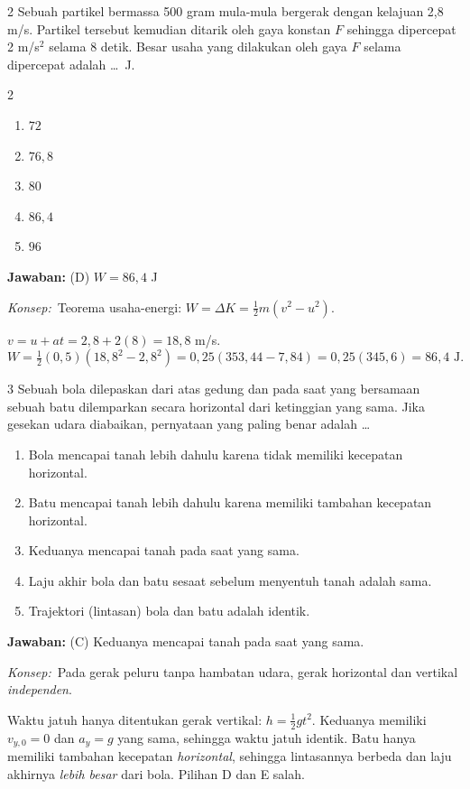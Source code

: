 \documentclass[11pt]{article}
\newcommand{\jawaban}[1]{%
  \noindent\colorbox{gold!30}{\parbox{\dimexpr\linewidth-2\fboxsep\relax}{%
    \textbf{Jawaban:} #1}}\par\smallskip}
\newcommand{\konsep}{\noindent\textit{Konsep:}\ \ignorespaces}
\newenvironment{pil}{%
  \begin{enumerate}[label=(\Alph*),leftmargin=*,itemsep=1pt,topsep=3pt]}%
  {\end{enumerate}}
\newenvironment{pilB}{%
  \par\smallskip\begin{multicols}{2}
  \begin{enumerate}[label=(\Alph*),leftmargin=*,itemsep=1pt,topsep=3pt]}%
  {\end{enumerate}\end{multicols}}
\begin{document}
\begin{soal}{2}  %
Sebuah partikel bermassa 500 gram mula-mula bergerak dengan kelajuan
2,8 m/s. Partikel tersebut kemudian ditarik oleh gaya konstan $F$
sehingga dipercepat 2 m/s$^2$ selama 8 detik. Besar usaha yang
dilakukan oleh gaya $F$ selama dipercepat adalah \ldots\ J.
\begin{pilB}
  \item $72$ \item $76{,}8$ \item $80$ \item $86{,}4$ \item $96$
\end{pilB}
\end{soal}
\begin{pembox}
\jawaban{(D) $W = 86{,}4$ J}
\konsep Teorema usaha-energi: $W = \Delta K = \tfrac{1}{2}m(v^2-u^2)$.

$v = u + at = 2{,}8 + 2(8) = 18{,}8$ m/s.
\[ W = \tfrac{1}{2}(0{,}5)(18{,}8^2 - 2{,}8^2) = 0{,}25(353{,}44-7{,}84) = 0{,}25(345{,}6) = 86{,}4 \text{ J}. \]
\end{pembox}

\begin{soal}{3}  %
Sebuah bola dilepaskan dari atas gedung dan pada saat yang bersamaan
sebuah batu dilemparkan secara horizontal dari ketinggian yang sama.
Jika gesekan udara diabaikan, pernyataan yang paling benar adalah \ldots
\begin{pil}
  \item Bola mencapai tanah lebih dahulu karena tidak memiliki
        kecepatan horizontal.
  \item Batu mencapai tanah lebih dahulu karena memiliki tambahan
        kecepatan horizontal.
  \item Keduanya mencapai tanah pada saat yang sama.
  \item Laju akhir bola dan batu sesaat sebelum menyentuh tanah
        adalah sama.
  \item Trajektori (lintasan) bola dan batu adalah identik.
\end{pil}
\end{soal}
\begin{pembox}
\jawaban{(C) Keduanya mencapai tanah pada saat yang sama.}
\konsep Pada gerak peluru tanpa hambatan udara, gerak horizontal dan vertikal \textit{independen}.

Waktu jatuh hanya ditentukan gerak vertikal: $h = \tfrac{1}{2}gt^2$. Keduanya memiliki $v_{y,0}=0$ dan $a_y=g$ yang sama, sehingga waktu jatuh identik. Batu hanya memiliki tambahan kecepatan \textit{horizontal}, sehingga lintasannya berbeda dan laju akhirnya \textit{lebih besar} dari bola. Pilihan D dan E salah.
\end{pembox}
\end{document}
